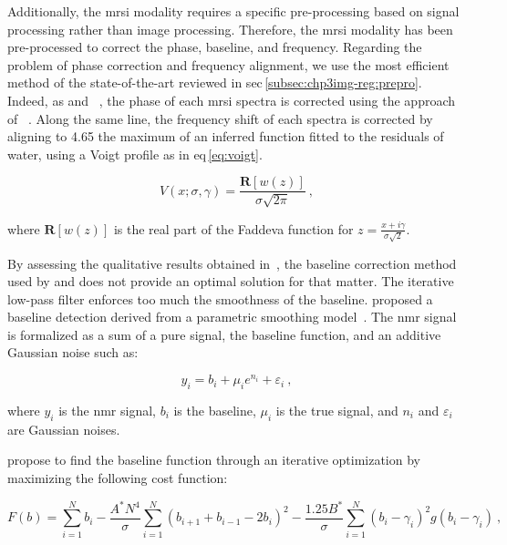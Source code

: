 Additionally, the \ac{mrsi} modality requires a specific pre-processing based on signal processing rather than image processing.
Therefore, the \ac{mrsi} modality has been pre-processed to correct the phase, baseline, and frequency.
Regarding the problem of phase correction and frequency alignment, we use the most efficient method of the state-of-the-art reviewed in \acs{sec}\,\ref{subsec:chp3img-reg:prepro}.
Indeed, as \citeauthor{Parfait2012} and \citeauthor{trigui2017automatic}~\cite{Parfait2012,trigui2016classification,trigui2017automatic}, the phase of each \ac{mrsi} spectra is corrected using the approach of \citeauthor{Chen2002}~\cite{Chen2002}.
Along the same line, the frequency shift of each spectra is corrected by aligning to \SI{4.65}{\ppm} the maximum of an inferred function fitted to the residuals of water, using a Voigt profile as in \acs{eq}\,\eqref{eq:voigt}.

\begin{equation}
  V(x; \sigma, \gamma) = \frac{\mathbf{R} \left[ w(z) \right]}{\sigma \sqrt{2\pi}} \ ,
  \label{eq:voigt}
\end{equation}

\noindent where $\mathbf{R} \left[ w(z) \right]$ is the real part of the Faddeva function for $z = \frac{x + i \gamma}{\sigma \sqrt{2}}$.

By assessing the qualitative results obtained in~\cite{Parfait2010}, the baseline correction method used by \citeauthor{Parfait2012} and \citeauthor{trigui2017automatic} does not provide an optimal solution for that matter.
The iterative low-pass filter enforces too much the smoothness of the baseline.
\citeauthor{xi2008baseline} proposed a baseline detection derived from a parametric smoothing model~\cite{xi2008baseline}.
The \ac{nmr} signal is formalized as a sum of a pure signal, the baseline function, and an additive Gaussian noise such as:

\begin{equation}
  y_i = b_i + \mu_i e^{n_i} + \varepsilon_i \ ,
  \label{eq:methodBaselineDetectionModel}
\end{equation}

\noindent where $y_i$ is the \ac{nmr} signal, $b_i$ is the baseline, $\mu_i$ is the true signal, and $n_i$ and $\varepsilon_i$ are Gaussian noises.

\citeauthor{xi2008baseline} propose to find the baseline function through an iterative optimization by maximizing the following cost function:

\begin{equation}
  F(b) = \sum_{i = 1}^{N} b_i - \frac{A^{*} N^4}{\sigma} \sum_{i = 1}^{N} (b_{i+1} + b_{i-1} - 2 b_i)^2 - \frac{1.25 B^{*}}{\sigma} \sum_{i = 1}^{N} (b_i - \gamma_i)^2 g(b_i - \gamma_i) \ ,
  \label{eq:methodBaselineDetectionCostFunction}
\end{equation}

